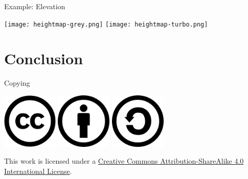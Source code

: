 \documentclass[pdf]{beamer}
\begin{document}
\begin{frame}{Example: Elevation}
  \begin{center}
    \texttt{[image: heightmap-grey.png]}
    \texttt{[image: heightmap-turbo.png]}
  \end{center}
\end{frame}

\section{Conclusion}
\frame{\tableofcontents[currentsection]}
\begin{frame}{Copying}\Large
  \begin{center}
    \includegraphics[width=0.2\textwidth]{CC.png}
    \includegraphics[width=0.2\textwidth]{BY.png}
    \includegraphics[width=0.2\textwidth]{SA.png}
  \end{center}

  This work is licensed under a
  \href{https://creativecommons.org/licenses/by-sa/4.0/}{Creative Commons
  Attribution-ShareAlike 4.0 International License}.
\end{frame}
\end{document}

